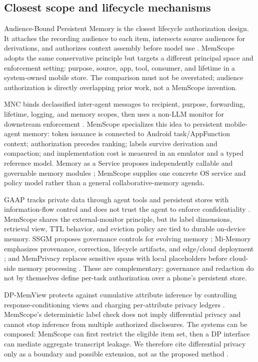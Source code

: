 \subsection{Closest scope and lifecycle mechanisms}

Audience-Bound Persistent Memory is the closest lifecycle authorization design. It attaches the recording audience to each item, intersects source audiences for derivations, and authorizes context assembly before model use \citep{liu2026audience}. MemScope adopts the same conservative principle but targets a different principal space and enforcement setting: purpose, source, app, tool, consumer, and lifetime in a system-owned mobile store. The comparison must not be overstated; audience authorization is directly overlapping prior work, not a MemScope invention.

MNC binds declassified inter-agent messages to recipient, purpose, forwarding, lifetime, logging, and memory scopes, then uses a non-LLM monitor for downstream enforcement \citep{xu2026mnc}. MemScope specializes this idea to persistent mobile-agent memory: token issuance is connected to Android task/AppFunction context; authorization precedes ranking; labels survive derivation and compaction; and implementation cost is measured in an emulator and a typed reference model. Memory as a Service proposes independently callable and governable memory modules \citep{li2025maas}; MemScope supplies one concrete OS service and policy model rather than a general collaborative-memory agenda.

GAAP tracks private data through agent tools and persistent stores with information-flow control and does not trust the agent to enforce confidentiality \citep{stanley2026gaap}. MemScope shares the external-monitor principle, but its label dimensions, retrieval view, TTL behavior, and eviction policy are tied to durable on-device memory. SSGM proposes governance controls for evolving memory \citep{lam2026ssgm}; Mi-Memory emphasizes provenance, correction, lifecycle artifacts, and edge/cloud deployment \citep{liu2026mimemory}; and MemPrivacy replaces sensitive spans with local placeholders before cloud-side memory processing \citep{chen2026memprivacy}. These are complementary: governance and redaction do not by themselves define per-task authorization over a phone's persistent store.

DP-MemView protects against cumulative attribute inference by controlling response-conditioning views and charging per-attribute privacy ledgers \citep{kim2026dpmemview}. MemScope's deterministic label check does not imply differential privacy and cannot stop inference from multiple authorized disclosures. The systems can be composed: MemScope can first restrict the eligible item set, then a DP interface can mediate aggregate transcript leakage. We therefore cite differential privacy only as a boundary and possible extension, not as the proposed method \citep{dwork2014algorithmic}.

